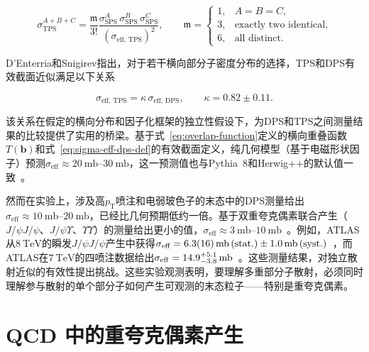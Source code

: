 \begin{equation}
  \label{eq:tps-pocket}
  \sigma_{\mathrm{TPS}}^{A+B+C}
  =
  \frac{\mathfrak{m}}{3!}
  \frac{\sigma_{\mathrm{SPS}}^{A}\,\sigma_{\mathrm{SPS}}^{B}\,\sigma_{\mathrm{SPS}}^{C}}
       {(\sigma_{\mathrm{eff},\,\mathrm{TPS}})^2},
  \qquad
  \mathfrak{m}=
  \begin{cases}
    1, & A = B = C,\\
    3, & \text{exactly two identical},\\
    6, & \text{all distinct}.
  \end{cases}
\end{equation}

D'Enterria和Snigirev指出，对于若干横向部分子密度分布的选择，TPS和DPS有效截面近似满足以下关系~\cite{WHQAFHD5,denterriaDoubleTripleNparton2017}

\begin{equation}
  \label{eq:dps-tps-relation}
  \sigma_{\mathrm{eff},\,\mathrm{TPS}}
  =
  \kappa\,\sigma_{\mathrm{eff},\,\mathrm{DPS}},
  \qquad
  \kappa = 0.82 \pm 0.11 .
\end{equation}

该关系在假定的横向分布和因子化框架的独立性假设下，为DPS和TPS之间测量结果的比较提供了实用的桥梁。基于式~\eqref{eq:overlap-function}定义的横向重叠函数$T(\mathbf{b})$和式~\eqref{eq:sigma-eff-dps-def}的有效截面定义，纯几何模型（基于电磁形状因子）预测$\sigma_\mathrm{eff} \approx \SIrange{20}{30}{\milli\barn}$，这一预测值也与Pythia~8和Herwig++的默认值一致~\cite{Z48W3VLV}。

然而在实验上，涉及高$p_{\mathrm T}$喷注和电弱玻色子的末态中的DPS测量给出$\sigma_\mathrm{eff} \approx \SIrange{10}{20}{\milli\barn}$，已经比几何预期低约一倍。基于双重夸克偶素联合产生（$J/\psi J/\psi$、$J/\psi\Upsilon$、$\Upsilon\Upsilon$）的测量给出更小的值，$\sigma_\mathrm{eff} \approx \SIrange{3}{10}{\milli\barn}$~\cite{WHQAFHD5,zhaoExperimentalReviewQuarkonium2025}。例如，ATLAS从$\SI{8}{\tera\eV}$的瞬发$J/\psi J/\psi$产生中获得$\sigma_\mathrm{eff} = \SI{6.3 \pm 1.6}{\milli\barn}\,(\mathrm{stat.}) \pm \SI{1.0}{\milli\barn}\,(\mathrm{syst.})$~\cite{ATLAS_JPSIJPSI_8TEV}，而ATLAS在$\SI{7}{\tera\eV}$的四喷注数据给出$\sigma_\mathrm{eff} = \SI[parse-numbers=false]{14.9^{+5.1}_{-3.8}}{\milli\barn}$~\cite{ATLAS:2016:4jet-DPS}。这些测量结果，对独立散射近似的有效性提出挑战。这些实验观测表明，要理解多重部分子散射，必须同时理解参与散射的单个部分子如何产生可观测的末态粒子——特别是重夸克偶素。

\section{QCD 中的重夸克偶素产生}
\label{sec:theory-quarkonium-production}

